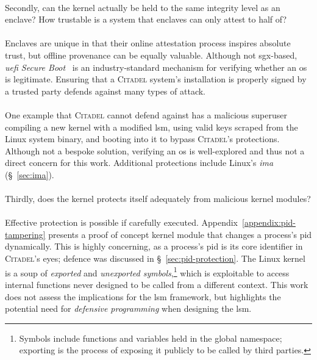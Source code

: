 \paragraph{} Secondly, can the kernel actually be held to the same integrity level as an enclave? How trustable is a system that enclaves can only attest to half of?

\paragraph{} Enclaves are unique in that their online attestation process inspires absolute trust, but offline provenance can be equally valuable. Although not \acrshort{sgx}-based, \textit{\acrshort{uefi} Secure Boot}~\cite{Richardson2013UefiSB} is an industry-standard mechanism for verifying whether an \acrshort{os} is legitimate. Ensuring that a \textsc{Citadel} system's installation is properly signed by a trusted party defends against many types of attack. 

\paragraph{} One example that \textsc{Citadel} cannot defend against has a malicious superuser compiling a new kernel with a modified \acrshort{lsm}, using valid keys scraped from the Linux system binary, and booting into it to bypass \textsc{Citadel}'s protections. Although not a bespoke solution, verifying an \acrshort{os} is well-explored and thus not a direct concern for this work. Additional protections include Linux's \textit{\acrlong{ima}} (§~\ref{sec:ima}).

\paragraph{} Thirdly, does the kernel protects itself adequately from malicious kernel modules?

\paragraph{} Effective protection is possible if carefully executed. Appendix~\ref{appendix:pid-tampering} presents a proof of concept kernel module that changes a process's \acrshort{pid} dynamically. This is highly concerning, as a process's \acrshort{pid} is its core identifier in \textsc{Citadel}'s eyes; defence was discussed in §~\ref{sec:pid-protection}. The Linux kernel is a soup of \textit{exported} and \textit{unexported symbols},\footnote{Symbols include functions and variables held in the global namespace; exporting is the process of exposing it publicly to be called by third parties.} which is exploitable to access internal functions never designed to be called from a different context. This work does not assess the implications for the \acrshort{lsm} framework, but highlights the potential need for \textit{defensive programming} when designing the \acrshort{lsm}.

